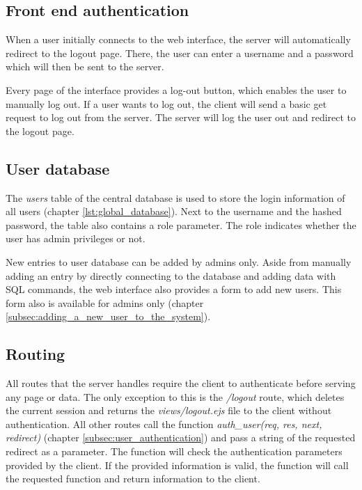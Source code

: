 \subsection{Front end authentication}
\label{subsec:front_end_authentication}
When a user initially connects to the web interface, the server will automatically redirect to the logout page. There, the user can enter a username and a password which will then be sent to the server.

Every page of the interface provides a log-out button, which enables the user to manually log out. 
If a user wants to log out, the client will send a basic get request to log out from the server. The server will log the user out and redirect to the logout page.



\subsection{User database}
\label{subsec:user_database}

The \textit{users} table of the central database is used to store the login information of all users (chapter \ref{lst:global_database}). Next to the username and the hashed password, the table also contains a role parameter.  The role indicates whether the user has admin privileges or not.

New entries to user database can be added by admins only. Aside from manually adding an entry by directly connecting to the database and adding data with SQL commands, the web interface also provides a form to add new users. This form also is available for admins only (chapter \ref{subsec:adding_a_new_user_to_the_system}).



\subsection{Routing}
\label{subsec:routing}
All routes that the server handles require the client to authenticate before serving any page or data. The only exception to this is the \textit{/logout} route, which deletes the current session and returns the \textit{views/logout.ejs} file to the client without authentication. All other routes call the function \textit{auth\_user(req, res, next, redirect)} (chapter \ref{subsec:user_authentication}) and pass a string of the requested redirect as a parameter. The function will check the authentication parameters provided by the client. If the provided information is valid, the function will call the requested function and return information to the client.



